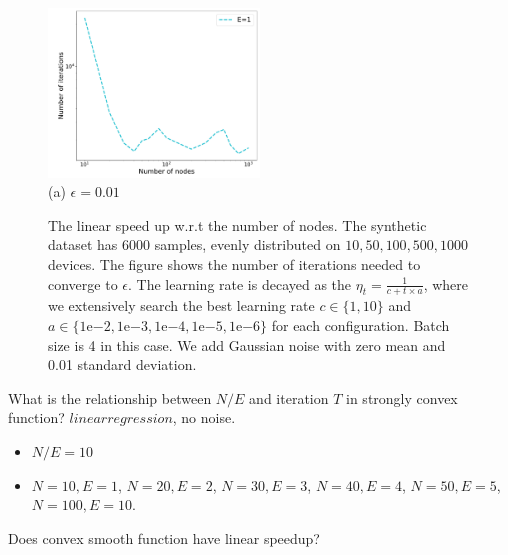 \begin{figure}
\centering
\includegraphics[width=0.5\textwidth]{fig/synthetic_linear_regression_noise1e-02-epsilon01008-logTrue-epoch-1-b4-adapt0.pdf} \\ 
(a) $\epsilon=0.01$ \\
	\caption{The linear speed up w.r.t the number of nodes. The synthetic dataset has $6000$ samples, evenly distributed on $10, 50, 100, 500, 1000$ devices. The figure shows the number of iterations needed to converge to $\epsilon$. The learning rate is decayed as the $\eta_t = \frac{1}{c + t \times a}$, where we extensively search the best learning rate $c \in \{1, 10\}$ and $a \in \{1\mathrm{e}{-2}, 1\mathrm{e}{-3}, 1\mathrm{e}{-4}, 1\mathrm{e}{-5}, 1\mathrm{e}{-6}\}$ for each configuration. Batch size is 4 in this case. 
	We add Gaussian noise with zero mean and 0.01 standard deviation.}
\end{figure}


What is the relationship between $N/E$ and iteration $T$ in strongly convex function? $linear regression$, no noise. 
\begin{itemize}
	\item $N/E = 10$
	\item $N=10, E=1$, $N=20, E=2$, $N=30, E=3$, $N=40, E=4$, $N=50, E=5$, $N=100, E=10$.
\end{itemize} 






Does convex smooth function have linear speedup?

